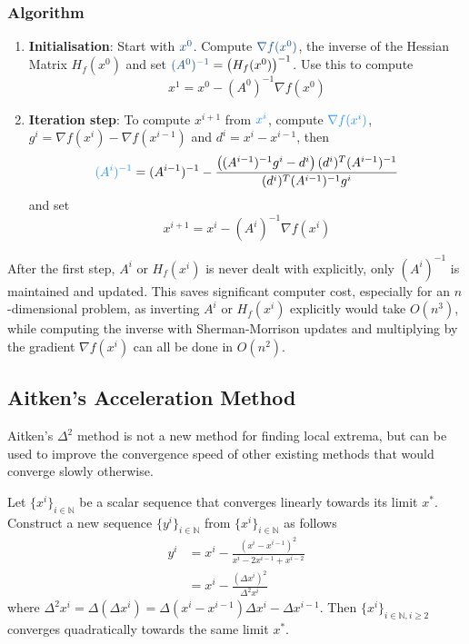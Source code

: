 \documentclass[11pt]{article}
\begin{document}
\subsubsection{Algorithm}
\begin{enumerate}
	\item \textbf{Initialisation}: Start with ${\color{DodgerBlue4} x^0}$. Compute ${\color{DodgerBlue4} \nabla f(x^0)}$, the inverse of the Hessian Matrix $H_f(x^0)$ and set ${\color{DodgerBlue4} (A^0)^{-1}} = \left(H_f(x^0)\right)^{-1} $. Use this to compute
	\begin{equation*}
		x^1 = x^0 - (A^0)^{-1}\nabla f(x^0)
	\end{equation*}
	\item \textbf{Iteration step}: To compute $x^{i+1}$ from ${\color{DodgerBlue1} x^i}$, compute ${\color{DodgerBlue1} \nabla f(x^i)}$, $g^i = \nabla f(x^i) - \nabla f(x^{i-1})$ and $d^i = x^i - x^{i-1}$, then
	\begin{equation*}
		{\color{DodgerBlue1}(A^{i})^{-1}} = (A^{i-1})^{-1} - \frac{\left((A^{i-1})^{-1}g^i-d^i\right)(d^i)^T(A^{i-1})^{-1}}{(d^i)^T(A^{i-1})^{-1}g^i}
	\end{equation*}
	and set
	\begin{equation*}
		x^{i+1} = x^i - (A^i)^{-1} \nabla f(x^i)
	\end{equation*}
\end{enumerate}

After the first step, $A^i$ or $H_f(x^i)$ is never dealt with explicitly, only $(A^i)^{-1}$ is maintained and updated. This saves significant computer cost, especially for an $n$-dimensional problem, as inverting $A^i$ or $ H_f(x^i)$ explicitly would take $O(n^3)$, while computing the inverse with Sherman-Morrison updates and multiplying by the gradient $\nabla f(x^i)$ can all be done in $O(n^2)$.

\subsection{Aitken's Acceleration Method}
Aitken's $\Delta^2$ method is not a new method for finding local extrema, but can be used to improve the convergence speed of other existing methods that would converge slowly otherwise.

Let $\{x^i\}_{i\in\mathbb{N}}$ be a scalar sequence that converges linearly towards its limit $x^*$. Construct a new sequence $\{y^i\}_{i\in\mathbb{N}}$ from $\{x^i\}_{i\in\mathbb{N}}$ as follows
\begin{align*}
y^i &= x^i - \frac{(x^i - x^{i-1})^2}{x^i - 2x^{i-1} + x^{i-2}}\\
&= x^i - \frac{(\Delta x^i)^2}{\Delta^2 x^i}
\end{align*}
where $\Delta^2 x^i = \Delta(\Delta x^i) = \Delta(x^i - x^{i-1}) \Delta x^i - \Delta x^{i-1}$. Then $\{x^i\}_{i\in\mathbb{N}, i\geq 2}$ converges quadratically towards the same limit $x^*$.
\end{document}
